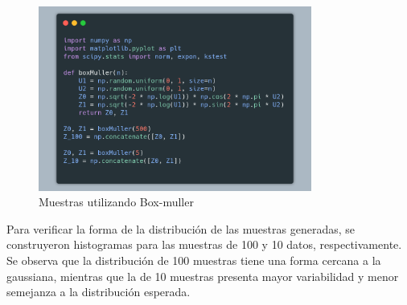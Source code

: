 \documentclass[a4paper,12pt]{article}
\begin{document}
	\begin{figure}[H]
		\centering
		\includegraphics[width=0.8\textwidth]{carbon1.png}
		\caption{Muestras utilizando Box-muller}
		\label{fig:ejemplo}
	\end{figure}
	
	Para verificar la forma de la distribuci\'on de las muestras generadas, se construyeron histogramas para las muestras de 100 y 10 datos, respectivamente. Se observa que la distribuci\'on de 100 muestras tiene una forma cercana a la gaussiana, mientras que la de 10 muestras presenta mayor variabilidad y menor semejanza a la distribuci\'on esperada.
	
\end{document}

